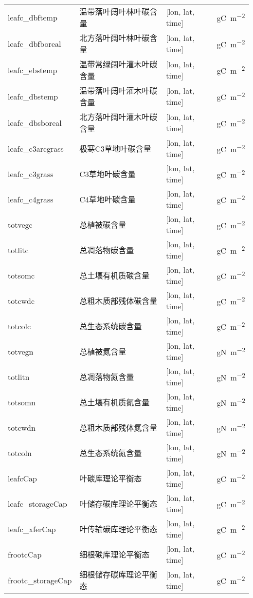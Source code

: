 {\begin{longtable}[htbp]{lp{}ll}
leafc\_dbftemp & 温带落叶阔叶林叶碳含量 & {[}lon, lat, time{]} & \unit{gC.m^{-2}} \\
leafc\_dbfboreal & 北方落叶阔叶林叶碳含量 & {[}lon, lat, time{]} & \unit{gC.m^{-2}} \\
leafc\_ebstemp & 温带常绿阔叶灌木叶碳含量 & {[}lon, lat, time{]} & \unit{gC.m^{-2}} \\
leafc\_dbstemp & 温带落叶阔叶灌木叶碳含量 & {[}lon, lat, time{]} & \unit{gC.m^{-2}} \\
leafc\_dbsboreal & 北方落叶阔叶灌木叶碳含量 & {[}lon, lat, time{]} & \unit{gC.m^{-2}} \\
leafc\_c3arcgrass & 极寒C3草地叶碳含量 & {[}lon, lat, time{]} & \unit{gC.m^{-2}} \\
leafc\_c3grass & C3草地叶碳含量 & {[}lon, lat, time{]} & \unit{gC.m^{-2}} \\
leafc\_c4grass & C4草地叶碳含量 & {[}lon, lat, time{]} & \unit{gC.m^{-2}} \\
totvegc & 总植被碳含量 & {[}lon, lat, time{]} & \unit{gC.m^{-2}} \\
totlitc & 总凋落物碳含量 & {[}lon, lat, time{]} & \unit{gC.m^{-2}} \\
totsomc & 总土壤有机质碳含量 & {[}lon, lat, time{]} & \unit{gC.m^{-2}} \\
totcwdc & 总粗木质部残体碳含量 & {[}lon, lat, time{]} & \unit{gC.m^{-2}} \\
totcolc & 总生态系统碳含量 & {[}lon, lat, time{]} & \unit{gC.m^{-2}} \\
totvegn & 总植被氮含量 & {[}lon, lat, time{]} & \unit{gN.m^{-2}} \\
totlitn & 总凋落物氮含量 & {[}lon, lat, time{]} & \unit{gN.m^{-2}} \\
totsomn & 总土壤有机质氮含量 & {[}lon, lat, time{]} & \unit{gN.m^{-2}} \\
totcwdn & 总粗木质部残体氮含量 & {[}lon, lat, time{]} & \unit{gN.m^{-2}} \\
totcoln & 总生态系统氮含量 & {[}lon, lat, time{]} & \unit{gN.m^{-2}} \\
leafcCap & 叶碳库理论平衡态 & {[}lon, lat, time{]} & \unit{gC.m^{-2}} \\
leafc\_storageCap & 叶储存碳库理论平衡态 & {[}lon, lat, time{]}  & \unit{gC.m^{-2}} \\
leafc\_xferCap & 叶传输碳库理论平衡态 & {[}lon, lat, time{]}  & \unit{gC.m^{-2}} \\
frootcCap & 细根碳库理论平衡态 & {[}lon, lat, time{]}  & \unit{gC.m^{-2}} \\
frootc\_storageCap& 细根储存碳库理论平衡态 & {[}lon, lat, time{]} & \unit{gC.m^{-2}} \\

\end{longtable}}
